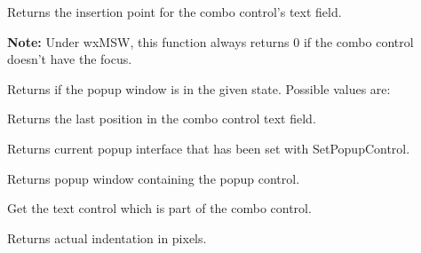 Returns the insertion point for the combo control's text field.

\textbf{Note:} Under wxMSW, this function always returns $0$ if the combo control
doesn't have the focus.


\label{wxcomboctrlispopupwindowstate}


Returns \true if the popup window is in the given state.
Possible values are:
\twocolwidtha{8cm}%
\begin{twocollist}\itemsep=0pt
\end{twocollist}



\label{wxcomboctrlgetlastposition}


Returns the last position in the combo control text field.


\label{wxcomboctrlgetpopupcontrol}


Returns current popup interface that has been set with SetPopupControl.


\label{wxcomboctrlgetpopupwindow}


Returns popup window containing the popup control.


\label{wxcomboctrlgettextctrl}


Get the text control which is part of the combo control.


\label{wxcomboctrlgettextindent}


Returns actual indentation in pixels.


\label{wxcomboctrlgettextrect}

